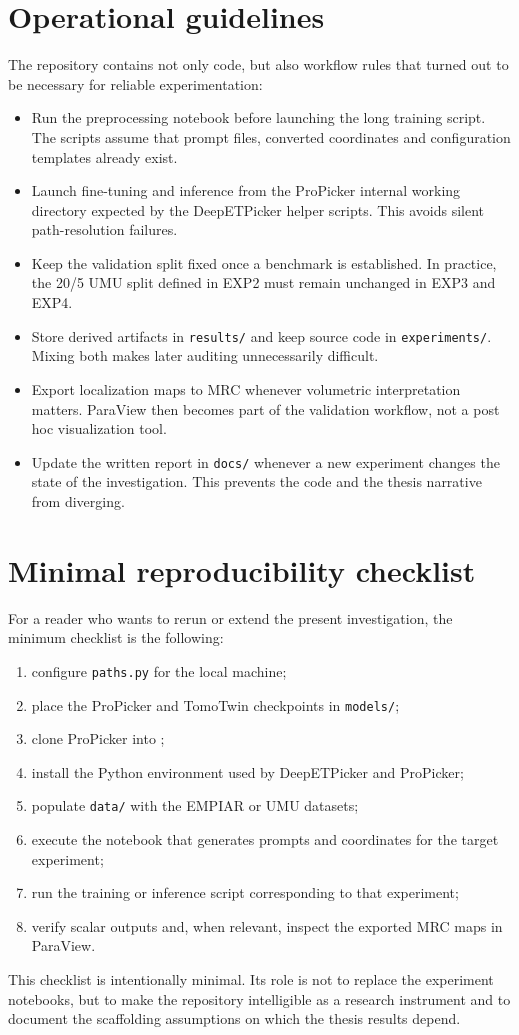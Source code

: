 \documentclass[12pt,a4paper]{report}
\begin{document}
\section{Operational guidelines}
The repository contains not only code, but also workflow rules that turned out to be necessary for reliable experimentation:
\begin{itemize}
  \item Run the preprocessing notebook before launching the long training script. The scripts assume that prompt files, converted coordinates and configuration templates already exist.
  \item Launch fine-tuning and inference from the ProPicker internal working directory expected by the DeepETPicker helper scripts. This avoids silent path-resolution failures.
  \item Keep the validation split fixed once a benchmark is established. In practice, the 20/5 UMU split defined in EXP2 must remain unchanged in EXP3 and EXP4.
  \item Store derived artifacts in \texttt{results/} and keep source code in \texttt{experiments/}. Mixing both makes later auditing unnecessarily difficult.
  \item Export localization maps to MRC whenever volumetric interpretation matters. ParaView then becomes part of the validation workflow, not a post hoc visualization tool.
  \item Update the written report in \texttt{docs/} whenever a new experiment changes the state of the investigation. This prevents the code and the thesis narrative from diverging.
\end{itemize}

\section{Minimal reproducibility checklist}
For a reader who wants to rerun or extend the present investigation, the minimum checklist is the following:
\begin{enumerate}
  \item configure \texttt{paths.py} for the local machine;
  \item place the ProPicker and TomoTwin checkpoints in \texttt{models/};
  \item clone ProPicker into ;
  \item install the Python environment used by DeepETPicker and ProPicker;
  \item populate \texttt{data/} with the EMPIAR or UMU datasets;
  \item execute the notebook that generates prompts and coordinates for the target experiment;
  \item run the training or inference script corresponding to that experiment;
  \item verify scalar outputs and, when relevant, inspect the exported MRC maps in ParaView.
\end{enumerate}

This checklist is intentionally minimal. Its role is not to replace the experiment notebooks, but to make the repository intelligible as a research instrument and to document the scaffolding assumptions on which the thesis results depend.
\end{document}
